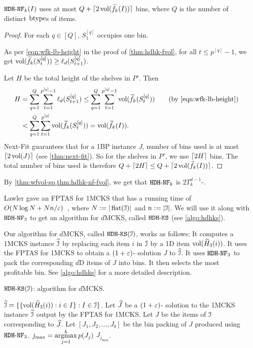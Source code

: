 \begin{theorem}
\label{thm:hdhk-nf-fvol}
$\hdhknf(I)$ uses at most $Q + \smallceil{2\vol(\wfk(I))}$ bins,
where $Q$ is the number of distinct $\btype$s of items.
\end{theorem}
\begin{proof}
For each $q \in [Q]$, $S_1^{[q]}$ occupies one bin.

As per \cref{eqn:wfk-lb-height} in the proof of \cref{thm:hdhk-fvol},
for all $t \le p^{[q]}-1$, we get $\vol(\wfk(S_t^{[q]}))
\ge \ell_d(S_{t+1}^{[q]})$.

Let $H$ be the total height of the shelves in $P'$. Then
\begin{align*}
H &= \sum_{q=1}^Q \sum_{t=1}^{p^{[q]}-1} \ell_d(S_{t+1}^{[q]})
\le \sum_{q=1}^Q \sum_{t=1}^{p^{[q]}-1} \vol(\wfk(S_t^{[q]}))  \tag{by \eqref{eqn:wfk-lb-height}}
\\ &< \sum_{q=1}^Q \sum_{t=1}^{p^{[q]}} \vol(\wfk(S_t^{[q]}))
= \vol(\wfk(I)).
\end{align*}
Next-Fit guarantees that for a 1BP instance $J$,
number of bins used is at most $\ceil{2\vol(J)}$ (see \cref{thm:next-fit}).
So for the shelves in $P'$, we use $\ceil{2H}$ bins.
The total number of bins used is therefore
$Q + \ceil{2H} \le Q + \smallceil{2\vol(\wfk(I))}$.
\end{proof}

By \cref{thm:wfvol-sp,thm:hdhk-nf-fvol}, we get that $\hdhknf$ is $2T_k^{d-1}$-\asymAppx{}.

Lawler gave an FPTAS for 1MCKS that has a running time of
$O(N\log N + Nn/\eps)$~\cite{lawler1979fast},
where $N \defeq |\flatten(\Ical)|$ and $n \defeq |\Ical|$.
We will use it along with $\hdhknf[3]$ to get an algorithm for $d$MCKS,
called $\hdhks$ (see \cref{algo:hdhks}).

Our algorithm for $d$MCKS, called $\hdhks(\Ical)$, works as follows:
It computes a 1MCKS instance $\Icalhat$ by replacing each item $i$ in $\Ical$
by a 1D item $\vol(\wHk[3](i))$.
It uses the FPTAS for 1MCKS to obtain a $(1+\eps)$-\appx{} solution $J$ to $\Icalhat$.
It uses $\hdhknf[3]$ to pack the corresponding $d$D items of $J$ into bins.
It then selects the most profitable bin.
See \cref{algo:hdhks} for a more detailed description.

\begin{algorithm}[!ht]
\caption{$\hdhks(\Ical)$: algorithm for $d$MCKS.}
\label{algo:hdhks}
\begin{algorithmic}[1]
\State $\Icalhat = \{\{\vol(\wHk[3](i)): i \in I\}: I \in \Ical\}$.
\State Let $\Jhat$ be a $(1+\eps)$-\appx{} solution to the 1MCKS instance $\Icalhat$
    output by the FPTAS for 1MCKS.
\State Let $J$ be the items of $\Ical$ corresponding to $\Jhat$.
\State Let $[J_1, J_2, \ldots, J_b]$ be the bin packing of $J$ produced using $\hdhknf[3]$.
\State ${\displaystyle j_{\max} = \argmax_{j=1}^b p(J_j)}$
\State \Return $J_{j_{\max}}$.
\end{algorithmic}
\end{algorithm}

